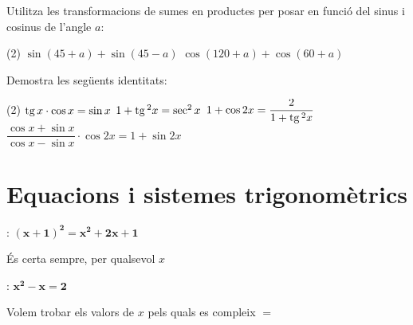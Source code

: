 \begin{mylist}
	\exer
	Utilitza les transformacions de sumes en productes per posar en funció
	del sinus i cosinus de l'angle $a$:
	
	\begin{tasks}(2)
		\task $\sin(45+a) + \sin(45 -a)$
		\task $\cos(120+a) + \cos(60 + a)$
	\end{tasks}

	
	
	\exer
	Demostra les següents identitats:
	\begin{tasks}(2)
		\task $\mathrm{tg}\, x \cdot \cos x = \sin x$
		\task $1+\mathrm{tg}\,^2 x = \sec^2 x$
		\task $1+\cos 2x = \dfrac{2}{1+\mathrm{tg}\,^2 x}$
		\task $\dfrac{\cos x + \sin x}{\cos x - \sin x}\cdot \cos 2x = 1 + \sin 2x$
	\end{tasks}
	
\end{mylist}



\section{Equacions i sistemes trigonomètrics}

 \begin{warningbox}
	\begin{multicols}{2}
		
		:  $\mathbf{(x+1)^2=x^2+2x+1}$
		
		{\footnotesize És certa sempre, per qualsevol $x$}
		
		\columnbreak
		
		: $\mathbf{x^2 -x =2}$
		
		{\footnotesize Volem trobar els valors de $x$ pels quals es compleix $=$}
	\end{multicols}
\end{warningbox}

\begin{theorybox}
	\begin{minipage}{0.33\textwidth}
		\centering
	\end{minipage}
	\begin{minipage}{0.33\textwidth}
		\centering
	\end{minipage}
	\begin{minipage}{0.33\textwidth}
		\centering
	\end{minipage}
\end{theorybox}

